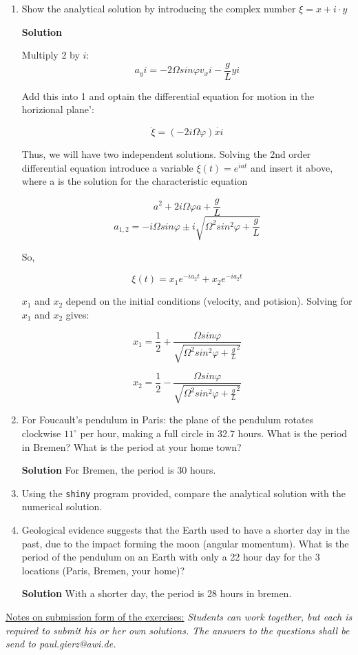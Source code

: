 \documentclass[a4paper,12pt]{article}
\begin{document}
\begin{enumerate}

\item Show the analytical solution by introducing the complex number
  $\xi = x + i \cdot y$


\textbf{Solution} 

Multiply 2 by $i$:
$$a_y i = -2 \Omega sin \varphi v_x i - \frac{g}{L} y i$$

Add this into 1 and optain the differential equation for motion in the
horizional plane':

$$\ddot{\xi} = (- 2 i \Omega \varphi) \dot{xi}$$

Thus, we will have two independent solutions. Solving the 2nd order
differential equation introduce a variable $\xi(t) = e^{iat}$ and insert it
above, where a is the solution for the characteristic equation

$$a^{2} + 2i\Omega \varphi a + \frac{g}{L}$$
$$a_{1,2} = -i \Omega sin \varphi \pm i \sqrt{\Omega ^{2} sin^{2}
  \varphi + \frac{g}{L}}$$

So,

$$\xi (t) = x_{1}e^{-ia_{2}t}+x_{2}e^{-ia_{2}t}$$

$x_{1}$ and $x_{2}$ depend on the initial conditions (velocity, and
potision). Solving for $x_{1}$ and $x_{2}$ gives:

$$x_{1} = \frac{1}{2} + \frac{\Omega sin
  \varphi}{\sqrt{\Omega^{2}sin^{2} \varphi + \frac{g}{L}^{2}}}$$

$$x_{2} = \frac{1}{2} - \frac{\Omega sin
  \varphi}{\sqrt{\Omega^{2}sin^{2} \varphi + \frac{g}{L}^{2}}}$$

\item For Foucault's pendulum in Paris: the plane of the pendulum
  rotates clockwise $11^{\circ}$ per hour, making a full circle in
  32.7 hours. What is the period in Bremen?  What is the period at
  your home town?

\textbf{Solution} For Bremen, the period is 30 hours.

\item Using the \texttt{shiny} program provided, compare the
  analytical solution with the numerical solution.

\item Geological evidence suggests that the Earth used to have a
  shorter day in the past, due to the impact forming the moon (angular
  momentum). What is
  the period of the pendulum on an Earth with only a 22 hour day for
  the 3 locations (Paris, Bremen, your home)?

\textbf{Solution} With a shorter day, the period is 28 hours in bremen.
\end{enumerate}


\vfill
\underline{Notes on submission form of the exercises:}
 \textit{Students can work together, but each is required to submit
   his or her own solutions. The answers to the questions shall be send to paul.gierz@awi.de.}
\end{document}

